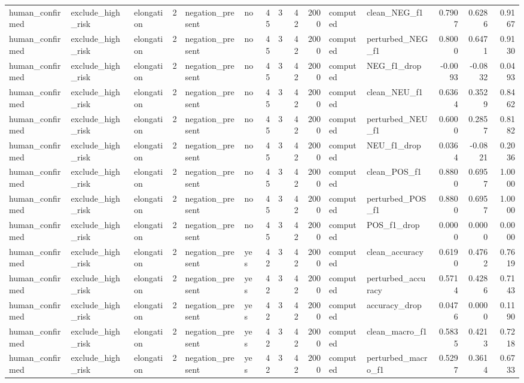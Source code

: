 \begin{tabular}{lllrllrrrrllrrr}
human_confirmed & exclude_high_risk & elongation & 2 & negation_present & no & 45 & 3 & 42 & 2000 & computed & clean_NEG_f1 & 0.7907 & 0.6286 & 0.9167 \\
human_confirmed & exclude_high_risk & elongation & 2 & negation_present & no & 45 & 3 & 42 & 2000 & computed & perturbed_NEG_f1 & 0.8000 & 0.6471 & 0.9130 \\
human_confirmed & exclude_high_risk & elongation & 2 & negation_present & no & 45 & 3 & 42 & 2000 & computed & NEG_f1_drop & -0.0093 & -0.0832 & 0.0493 \\
human_confirmed & exclude_high_risk & elongation & 2 & negation_present & no & 45 & 3 & 42 & 2000 & computed & clean_NEU_f1 & 0.6364 & 0.3529 & 0.8462 \\
human_confirmed & exclude_high_risk & elongation & 2 & negation_present & no & 45 & 3 & 42 & 2000 & computed & perturbed_NEU_f1 & 0.6000 & 0.2857 & 0.8182 \\
human_confirmed & exclude_high_risk & elongation & 2 & negation_present & no & 45 & 3 & 42 & 2000 & computed & NEU_f1_drop & 0.0364 & -0.0821 & 0.2036 \\
human_confirmed & exclude_high_risk & elongation & 2 & negation_present & no & 45 & 3 & 42 & 2000 & computed & clean_POS_f1 & 0.8800 & 0.6957 & 1.0000 \\
human_confirmed & exclude_high_risk & elongation & 2 & negation_present & no & 45 & 3 & 42 & 2000 & computed & perturbed_POS_f1 & 0.8800 & 0.6957 & 1.0000 \\
human_confirmed & exclude_high_risk & elongation & 2 & negation_present & no & 45 & 3 & 42 & 2000 & computed & POS_f1_drop & 0.0000 & 0.0000 & 0.0000 \\
human_confirmed & exclude_high_risk & elongation & 2 & negation_present & yes & 42 & 3 & 42 & 2000 & computed & clean_accuracy & 0.6190 & 0.4762 & 0.7619 \\
human_confirmed & exclude_high_risk & elongation & 2 & negation_present & yes & 42 & 3 & 42 & 2000 & computed & perturbed_accuracy & 0.5714 & 0.4286 & 0.7143 \\
human_confirmed & exclude_high_risk & elongation & 2 & negation_present & yes & 42 & 3 & 42 & 2000 & computed & accuracy_drop & 0.0476 & 0.0000 & 0.1190 \\
human_confirmed & exclude_high_risk & elongation & 2 & negation_present & yes & 42 & 3 & 42 & 2000 & computed & clean_macro_f1 & 0.5835 & 0.4213 & 0.7218 \\
human_confirmed & exclude_high_risk & elongation & 2 & negation_present & yes & 42 & 3 & 42 & 2000 & computed & perturbed_macro_f1 & 0.5297 & 0.3614 & 0.6733 \\

\end{tabular}
